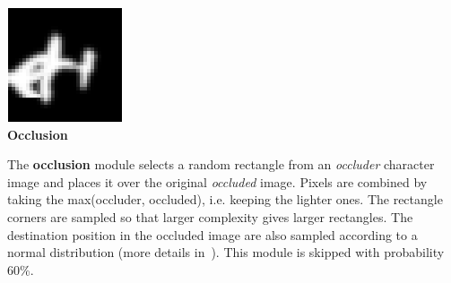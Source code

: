 \documentclass{article} %
\begin{document}
\begin{minipage}[h]{\linewidth}
\begin{minipage}[t]{0.14\linewidth}
\centering
\includegraphics[scale=.4]{images/occlusion_only.png}\\
{\bf Occlusion}
\end{minipage}%
\hspace{0.3cm}\begin{minipage}[t]{0.83\linewidth}
\vspace*{-18mm}
The {\bf occlusion} module selects a random rectangle from an {\em occluder} character
image and places it over the original {\em occluded}
image. Pixels are combined by taking the max(occluder, occluded),
i.e. keeping the lighter ones.
The rectangle corners
are sampled so that larger complexity gives larger rectangles.
The destination position in the occluded image are also sampled
according to a normal distribution (more details in~\citet{ARXIV-2010}).
This module is skipped with probability 60\%.
\end{minipage}
\end{minipage}

\vspace*{1mm}
\end{document}
